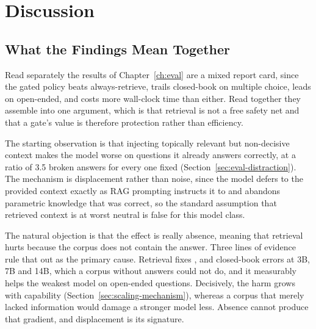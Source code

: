 \chapter{Discussion}
\label{ch:discussion}

\section{What the Findings Mean Together}
\label{sec:disc-synthesis}

Read separately the results of Chapter~\ref{ch:eval} are a mixed report card,
since the gated policy beats always-retrieve, trails closed-book on multiple
choice, leads on open-ended, and costs more wall-clock time than either. Read
together they assemble into one argument, which is that retrieval is not a
free safety net and that a gate's value is therefore protection rather than
efficiency.

The starting observation is that injecting topically relevant but
non-decisive context makes the model worse on questions it already answers
correctly, at a ratio of 3.5 broken answers for every one fixed
(Section~\ref{sec:eval-distraction}). The mechanism is displacement rather
than noise, since the model defers to the provided context exactly as RAG
prompting instructs it to and abandons parametric knowledge that was correct,
so the standard assumption that retrieved context is at worst neutral is false
for this model class.

The natural objection is that the effect is really absence, meaning that
retrieval hurts because the corpus does not contain the answer. Three lines of
evidence rule that out as the primary cause. Retrieval fixes \fixLlama{},
\fixQwenSeven{} and \fixQwenFourteen{} closed-book errors at 3B, 7B and 14B,
which a corpus without answers could not do, and it measurably helps the
weakest model on open-ended questions. Decisively, the harm grows with
capability (Section~\ref{sec:scaling-mechanism}), whereas a corpus that merely
lacked information would damage a stronger model less. Absence cannot produce
that gradient, and displacement is its signature.

